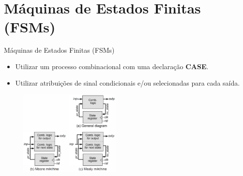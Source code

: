 \documentclass[aspectratio=169]{beamer}
\begin{document}
\section{Máquinas de Estados Finitas (FSMs)}
\begin{frame}{Máquinas de Estados Finitas (FSMs)}
	\justifying
	
	\begin{block}{}
	\begin{itemize}
		\item Utilizar um processo combinacional com uma declaração \textbf{CASE}.
		\item Utilizar atribuições de sinal condicionais e/ou selecionadas para cada saída.
	\end{itemize}	
	\end{block}	
	
	\begin{figure}[h]
		\centering
		\includegraphics[width=0.45\textwidth]{Figs/fig82.png}
	\end{figure}
	
\end{frame}
\end{document}
